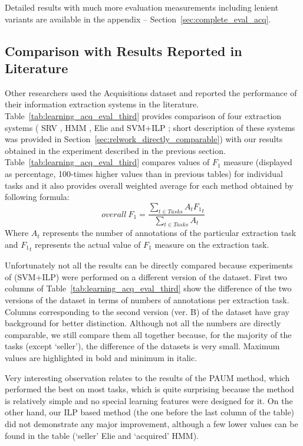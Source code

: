 Detailed results with much more evaluation measurements including lenient variants are available in the appendix -- Section~\ref{sec:complete_eval_acq}.


\subsection{Comparison with Results Reported in Literature} \label{sec:learning_eval_acq_third}

Other researchers used the Acquisitions dataset and reported the performance of their information extraction systems in the literature. Table~\ref{tab:learning_acq_eval_third} provides comparison of four extraction systems 
(
SRV \citep{Freitag:1999_phd},
HMM \citep{Freitag1999InformationExtraction},
Elie \citep{DBLP:conf/ecml/FinnK04} and 
SVM+ILP \citep{DBLP:conf/ilp/RamakrishnanJBS07};
short description of these systems was provided in Section~\ref{sec:relwork_directly_comparable}) with our results obtained in the experiment described in the previous section. 
Table~\ref{tab:learning_acq_eval_third} compares values of $F_1$ measure (displayed as percentage, 100-times higher values than in previous tables) for individual tasks and it also provides overall weighted average for each method obtained by following formula:
$$
overall\ F_1 = \frac{\sum_{t\in Tasks}{A_t {F_1}_t}}{\sum_{t\in Tasks}A_t}
$$
\noindent Where $A_t$ represents the number of annotations of the particular extraction task and ${F_1}_t$ represents the actual value of $F_1$ measure on the extraction task.

Unfortunately not all the results can be directly compared because experiments of \cite{DBLP:conf/ilp/RamakrishnanJBS07} (SVM+ILP) were performed on a different version of the dataset. First two columns of Table~\ref{tab:learning_acq_eval_third} show the difference of the two versions of the dataset in terms of numbers of annotations per extraction task. Columns corresponding to the second version (ver. B) of the dataset have gray background for better distinction. 
Although not all the numbers are directly comparable, we still compare them all together because, for the majority of the tasks (except `seller'), the difference of the datasets is very small. Maximum values are highlighted in bold and minimum in italic.

Very interesting observation relates to the results of the PAUM method, which performed the best on most tasks, which is quite surprising because the method is relatively simple and no special learning features were designed for it. On the other hand, our ILP based method (the one before the last column of the table) did not demonstrate any major improvement, although a few lower values can be found in the table (`seller' Elie and  `acquired' HMM). 

